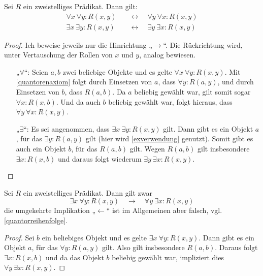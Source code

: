 \begin{satz} \label{quantorentausch}
    Sei $R$ ein zweistelliges Prädikat. Dann gilt:
    \begin{align*}
        \forall x\ \forall y: R(x,y) \quad &\leftrightarrow\quad \forall y\ \forall x: R(x,y) \\
        \exists x\ \exists y: R(x,y) \quad &\leftrightarrow\quad  \exists y\ \exists x: R(x,y)
    \end{align*}
\end{satz}
\begin{proof}
    Ich beweise jeweils nur die Hinrichtung „$\to$“. Die Rückrichtung wird, unter Vertauschung der Rollen von $x$ und $y$, analog bewiesen.
    \begin{itemize}
        \item[„$\forall$“:] Seien $a,b$ zwei beliebige Objekte und es gelte $\forall x\ \forall y: R(x,y)$. Mit \cref{quantorenaxiom} folgt durch Einsetzen von $a$, dass $\forall y: R(a,y)$, und durch Einsetzen von $b$, dass $R(a,b)$. Da $a$ beliebig gewählt war, gilt somit sogar $\forall x: R(x,b)$. Und da auch $b$ beliebig gewählt war, folgt hieraus, dass $\forall y\ \forall x: R(x,y)$.
        \item[„$\exists$“:] Es sei angenommen, dass $\exists x\ \exists y: R(x,y)$ gilt. Dann gibt es ein Objekt $a$, für das $\exists y: R(a,y)$ gilt (hier wird \cref{exverwendung} genutzt). Somit gibt es auch ein Objekt $b$, für das $R(a,b)$ gilt. Wegen $R(a,b)$ gilt insbesondere $\exists x: R(x,b)$ und daraus folgt wiederum $\exists y\ \exists x: R(x,y)$. \qedhere
    \end{itemize}
\end{proof}


\begin{satz}
    Sei $R$ ein zweistelliges Prädikat. Dann gilt zwar
        \[ \exists x\ \forall y: R(x,y) \quad\to\quad \forall y\ \exists x: R(x,y) \]  
    die umgekehrte Implikation „$\leftarrow$“ ist im Allgemeinen aber falsch, vgl. \cref{quantorreihenfolge}.
\end{satz}
\begin{proof}
    Sei $b$ ein beliebiges Objekt und es gelte $\exists x\ \forall y: R(x,y)$. Dann gibt es ein Objekt $a$, für das $\forall y: R(a,y)$ gilt. Also gilt insbesondere $R(a,b)$. Daraus folgt $\exists x: R(x,b)$ und da das Objekt $b$ beliebig gewählt war, impliziert dies $\forall y\ \exists x: R(x,y)$.
\end{proof}




